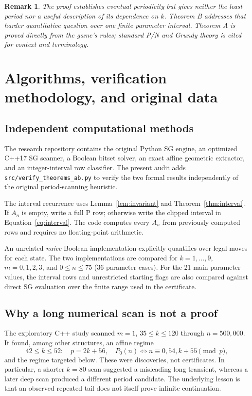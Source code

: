 \documentclass[11pt]{article}
\newtheorem{remark}[theorem]{Remark}
\begin{document}
\begin{remark}
The proof establishes eventual periodicity but gives neither the least
period nor a useful description of its dependence on $k$.  Theorem B
addresses that harder quantitative question over one finite parameter
interval.  Theorem A is proved directly from the game's rules; standard
P/N and Grundy theory is cited for context and terminology.
\end{remark}

\section{Algorithms, verification methodology, and original data}
\subsection{Independent computational methods}
The research repository contains the original Python SG engine, an optimized
C++17 SG scanner, a Boolean bitset solver, an exact affine geometric
extractor, and an integer-interval row classifier.  The present audit adds
\texttt{src/verify\_theorems\_ab.py} to verify the two formal results
independently of the original period-scanning heuristic.

The interval recurrence uses Lemma~\ref{lem:invariant} and
Theorem~\ref{thm:interval}.  If $A_n$ is empty, write a full P row;
otherwise write the clipped interval in Equation~\eqref{eq:interval}.
The code computes every $A_n$ from previously computed rows and requires no
floating-point arithmetic.

An unrelated \emph{naive} Boolean implementation explicitly quantifies over
legal moves for each state.  The two implementations are compared for
$k=1,\ldots,9$, $m=0,1,2,3$, and $0\le n\le75$ (36 parameter cases).
For the 21 main parameter values, the interval rows and unrestricted
starting flags are also compared against direct SG evaluation over the
finite range used in the certificate.

\subsection{Why a long numerical scan is not a proof}
The exploratory C++ study scanned $m=1$, $35\le k\le120$ through
$n=500{,}000$.  It found, among other structures, an affine regime
\[
42\le k\le52:\quad p=2k+56,\quad
P_0(n)\iff n\equiv0,54,k+55\pmod p,
\]
and the regime targeted below.  These were discoveries, not certificates.
In particular, a shorter $k=80$ scan suggested a misleading long transient,
whereas a later deep scan produced a different period candidate.  The
underlying lesson is that an observed repeated tail does not itself prove
infinite continuation.
\end{document}
